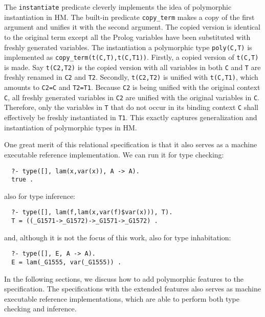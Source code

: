 \documentclass[runningheads,a4paper]{llncs}
\begin{document}
The {\small\verb|instantiate|} predicate
cleverly implements the idea of polymorphic instantiation in HM.
The built-in predicate {\small\verb|copy_term|} makes a copy of
the first argument and unifies it with the second argument. The copied version
is identical to the original term except all the Prolog variables have been
substituted with freshly generated variables. The instantiation a polymorphic
type {\small\verb|poly(C,T)|} is implemented as
{\small\verb|copy_term(t(C,T),t(C,T1))|}.
Firstly, a copied version of {\small\verb|t(C,T)|} is made.
Say {\small\verb|t(C2,T2)|} is the copied version with all variables
in both {\small\verb|C|} and {\small\verb|T|}
are freshly renamed in {\small\verb|C2|} and {\small\verb|T2|}.
Secondly, {\small\verb|t(C2,T2)|}
is unified with {\small\verb|t(C,T1)|}, which amounts to {\small\verb|C2=C|}
and {\small\verb|T2=T1|}. Because {\small\verb|C2|} is being unified with
the original context {\small\verb|C|}, all freshly generated variables in
{\small\verb|C2|} are unified with the original variables in \verb|C|.
Therefore, only the variables in {\small\verb|T|} that do not occur in its
binding context {\small\verb|C|} shall effectively be freshly instantiated in 
{\small\verb|T1|}. This exactly captures generalization and instantiation of
polymorphic types in HM.

One great merit of this relational specification is that it also serves as
a machine executable reference implementation. We can run it
for type checking: {\small \vspace*{-1ex}
\begin{verbatim}
  ?- type([], lam(x,var(x)), A -> A).         
  true .
\end{verbatim} \vspace*{-.7ex} }\noindent
also for type inference: {\small \vspace*{-1ex}
\begin{verbatim}
  ?- type([], lam(f,lam(x,var(f)$var(x))), T).
  T = ((_G1571->_G1572)->_G1571->_G1572) .
\end{verbatim} \vspace*{-.7ex} }\noindent
and, although it is not the focus of this work,
also for type inhabitation: {\small \vspace*{-1ex}
\begin{verbatim}
  ?- type([], E, A -> A).
  E = lam(_G1555, var(_G1555)) .
\end{verbatim} \vspace*{-.7ex} }

In the following sections, we discuss how to add polymorphic features
to the specification. The specifications with the extended features
also serves as machine executable reference implementations, which
are able to perform both type checking and inference.
\end{document}
